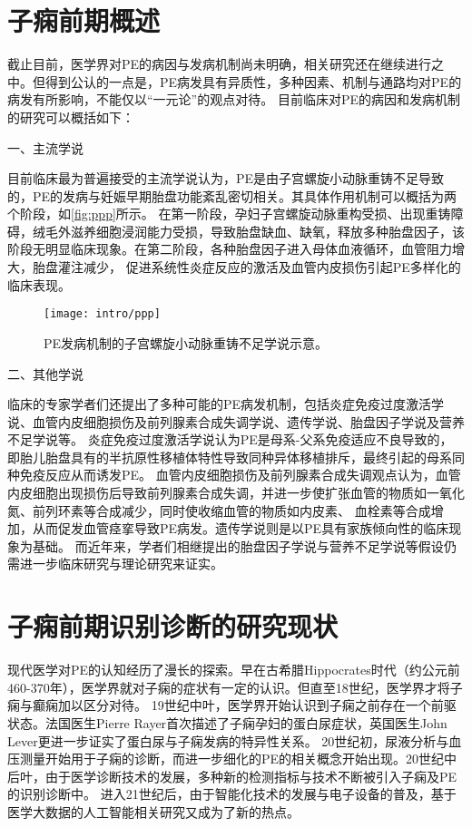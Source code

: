 \section{子痫前期概述}
截止目前，医学界对PE的病因与发病机制尚未明确，相关研究还在继续进行之中。但得到公认的一点是，PE病发具有异质性，多种因素、机制与通路均对PE的病发有所影响，不能仅以“一元论”的观点对待。
目前临床对PE的病因和发病机制的研究可以概括如下：

一、主流学说

目前临床最为普遍接受的主流学说认为，PE是由子宫螺旋小动脉重铸不足导致的，PE的发病与妊娠早期胎盘功能紊乱密切相关\cite{OAG9,Duvekot2010,2009ix}。其具体作用机制可以概括为两个阶段，如\autoref{fig:ppp}所示。
在第一阶段，孕妇子宫螺旋动脉重构受损、出现重铸障碍，绒毛外滋养细胞浸润能力受损，导致胎盘缺血、缺氧，释放多种胎盘因子，该阶段无明显临床现象。在第二阶段，各种胎盘因子进入母体血液循环，血管阻力增大，胎盘灌注减少，
促进系统性炎症反应的激活及血管内皮损伤引起PE多样化的临床表现。
\begin{figure}[htbp]
    \centering
    \texttt{[image: intro/ppp]}
    \caption[PE发病机制的子宫螺旋小动脉重铸不足学说示意]{\label{fig:ppp}PE发病机制的子宫螺旋小动脉重铸不足学说示意\cite{Duvekot2010,2009ix}。}
\end{figure}

二、其他学说

临床的专家学者们还提出了多种可能的PE病发机制，包括炎症免疫过度激活学说、血管内皮细胞损伤及前列腺素合成失调学说、遗传学说、胎盘因子学说及营养不足学说等。
炎症免疫过度激活学说认为PE是母系-父系免疫适应不良导致的，即胎儿胎盘具有的半抗原性移植体特性导致同种异体移植排斥，最终引起的母系同种免疫反应从而诱发PE\cite{Sibai2005,OAG9,Shi2006,Moffett2002}。
血管内皮细胞损伤及前列腺素合成失调观点认为，血管内皮细胞出现损伤后导致前列腺素合成失调，并进一步使扩张血管的物质如一氧化氮、前列环素等合成减少，同时使收缩血管的物质如内皮素、
血栓素等合成增加，从而促发血管痉挛导致PE病发\cite{OAG9,Sibai2005}。遗传学说则是以PE具有家族倾向性的临床现象为基础\cite{OAG9,Sibai2005,Ge2013}。
而近年来，学者们相继提出的胎盘因子学说\cite{Shi2006}与营养不足学说\cite{OAG9}等假设仍需进一步临床研究与理论研究来证实。
\raggedbottom

\section{子痫前期识别诊断的研究现状}
现代医学对PE的认知经历了漫长的探索\cite{BJOG2016}。早在古希腊Hippocrates时代（约公元前460-370年），医学界就对子痫的症状有一定的认识。但直至18世纪，医学界才将子痫与癫痫加以区分对待。
19世纪中叶，医学界开始认识到子痫之前存在一个前驱状态。法国医生Pierre Rayer首次描述了子痫孕妇的蛋白尿症状，英国医生John Lever更进一步证实了蛋白尿与子痫发病的特异性关系。
20世纪初，尿液分析与血压测量开始用于子痫的诊断，而进一步细化的PE的相关概念开始出现。20世纪中后叶，由于医学诊断技术的发展，多种新的检测指标与技术不断被引入子痫及PE的识别诊断中。
进入21世纪后，由于智能化技术的发展与电子设备的普及，基于医学大数据的人工智能相关研究又成为了新的热点。

